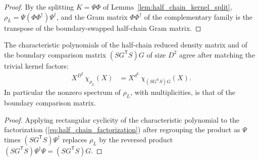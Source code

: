 \begin{proof}
    \leanok
    By the splitting $K=\Psi\Phi$ of
    Lemma~\ref{lem:half_chain_kernel_split},
    $\rho_L=\Psi(\Phi\Phi^{\dagger})\Psi^{\dagger}$, and the Gram matrix
    $\Phi\Phi^{\dagger}$ of the complementary family is the transpose of the
    boundary-swapped half-chain Gram matrix.
\end{proof}

\begin{lemma}%
    \label{thm:half_chain_charpoly}
    \leanok
    The characteristic polynomials of the half-chain reduced density matrix
    and of the boundary comparison matrix $(SG^{\mathsf T}S)G$ of size $D^2$
    agree after matching the trivial kernel factors:
    \begin{align}
        X^{D^2}\,\chi_{\rho_L}(X)
         & =X^{d^L}\,\chi_{(SG^{\mathsf T}S)G}(X).
        \label{eq:half_chain_charpoly}
    \end{align}
    In particular the nonzero spectrum of $\rho_L$, with multiplicities, is
    that of the boundary comparison matrix.
\end{lemma}

\begin{proof}
    \leanok
    Applying rectangular cyclicity of the characteristic polynomial to the
    factorization (\ref{eq:half_chain_factorization}) after regrouping the product
    as $\Psi$ times $(SG^{\mathsf T}S)\Psi^{\dagger}$ replaces $\rho_L$ by the reversed product
    $(SG^{\mathsf T}S)\Psi^{\dagger}\Psi=(SG^{\mathsf T}S)G$.
\end{proof}

